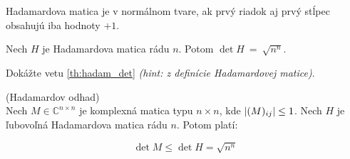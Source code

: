 \begin{definition}
Hadamardova matica je v normálnom tvare, ak prvý riadok aj prvý stĺpec obsahujú iba hodnoty $+1$.
\end{definition}

\begin{theorem}
\label{th:hadam_det}
Nech $H$ je Hadamardova matica rádu $n$. Potom $\det{H}~=~\sqrt{n^n}$.
\end{theorem}

\begin{exercise}
Dokážte vetu \ref{th:hadam_det} \emph{(hint: z definície Hadamardovej matice)}.
\end{exercise}

\begin{theorem_hard}{(Hadamardov odhad)}\\
Nech $M \in \mathbb{C}^{n\times n}$ je komplexná matica typu $n\times n$, kde $\left|(M)_{ij}\right| \leq 1$. 
Nech $H$ je ľubovoľná Hadamardova matica rádu $n$.
Potom platí:

$$\det{M} \leq \det{H} = \sqrt{n^n}$$

\end{theorem_hard}

